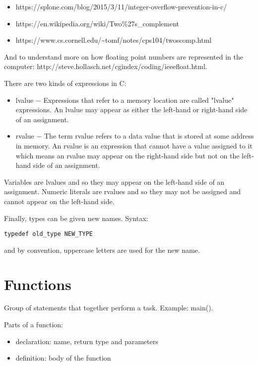 \documentclass[11pt]{article}
\begin{document}
\begin{itemize}
\item https://splone.com/blog/2015/3/11/integer-overflow-prevention-in-c/
\item https://en.wikipedia.org/wiki/Two\%27s\_complement
\item https://www.cs.cornell.edu/{\textasciitilde}tomf/notes/cps104/twoscomp.html
\end{itemize}

And to understand more on how floating point numbers are represented in the computer: http://steve.hollasch.net/cgindex/coding/ieeefloat.html.

There are two kinds of expressions in C:

\begin{itemize}
\item lvalue − Expressions that refer to a memory location are called "lvalue" expressions. An lvalue may appear as either the left-hand or right-hand side of an assignment.
\item rvalue − The term rvalue refers to a data value that is stored at some address in memory. An rvalue is an expression that cannot have a value assigned to it which means an rvalue may appear on the right-hand side but not on the left-hand side of an assignment.
\end{itemize}

Variables are lvalues and so they may appear on the left-hand side of an assignment. Numeric literals are rvalues and so they may not be assigned and cannot appear on the left-hand side.

Finally, types can be given new names. Syntax:

\begin{lstlisting}[numbers=none]
typedef old_type NEW_TYPE
\end{lstlisting}

and by convention, uppercase letters are used for the new name.


\section{Functions}

Group of statements that together perform a task. Example: main().

Parts of a function:

\begin{itemize}
\item declaration: name, return type and parameters
\item definition: body of the function
\end{itemize}
\end{document}
